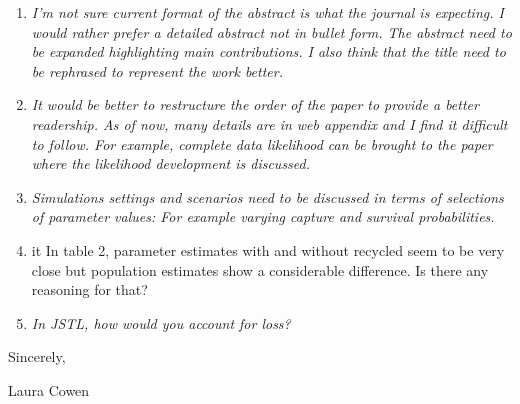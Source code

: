 \documentclass[12pt]{article}
\begin{document}
\begin{enumerate}
\item  {\it I’m not sure current format of the abstract is what the journal is expecting. I would rather prefer a detailed abstract not in bullet form. The abstract need to be expanded highlighting main contributions.   I also think that the title need to be rephrased to represent the work better. }

\item {\it It would be better to restructure the order of the paper to provide a better readership. As of now, many details are in web appendix and I find it difficult to follow. For example, complete data likelihood can be brought to the paper where the likelihood development is discussed.}

\item {\it Simulations settings and scenarios need to be discussed in terms of selections of parameter values: For example varying capture and survival probabilities.}

\item {it In table 2, parameter estimates with and without recycled seem to be very close but population estimates show a considerable difference. Is there any reasoning for that?}

\item {\it In JSTL, how would you account for loss?}
\end{enumerate}





\noindent Sincerely,

\bigskip

\bigskip


\noindent Laura Cowen
\end{document}

